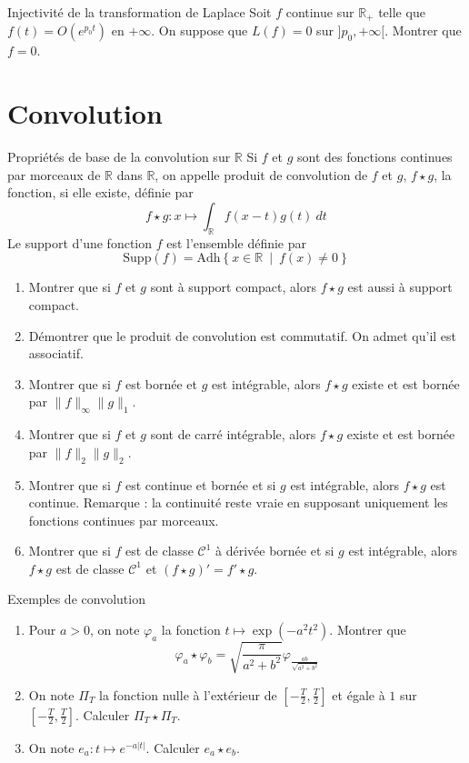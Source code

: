 \documentclass[french,a4paper]{article}
\newcommand{\R}{\mathbb{R}}
\theoremstyle{plain}
\theoremstyle{definition}
\theoremstyle{remark}
\begin{document}
\begin{ex}[Châteaux]{Injectivité de la transformation de Laplace}
	Soit $f$ continue sur $\R_+$ telle que $f(t)=O(e^{p_0t})$ en $+\infty$. On suppose que $L(f)=0$ sur $]p_0,+\infty[$. Montrer que $f=0$.
\end{ex}

\section{Convolution}

\begin{ex}[Châteaux]{Propriétés de base de la convolution sur $\R$}
	Si $f$ et $g$ sont des fonctions continues par morceaux de $\R$ dans $\R$, on appelle produit de convolution de $f$ et $g$, $f\star g$, la fonction, si elle existe, définie par $$f\star g:x\mapsto\displaystyle\int_\R f(x-t)g(t)\ dt$$Le support d'une fonction $f$ est l'ensemble définie par $$\text{Supp}(f)=\text{Adh}\left\{x\in\R\ \mid \ f(x)\ne 0\right\}$$
	\begin{enumerate}
		\item Montrer que si $f$ et $g$ sont à support compact, alors $f\star g$ est aussi à support compact.
		\item Démontrer que le produit de convolution est commutatif. On admet qu'il est associatif.
		\item Montrer que si $f$ est bornée et $g$ est intégrable, alors $f\star g$ existe et est bornée par $\lVert f\rVert_\infty\lVert g\rVert_1$.
		\item Montrer que si $f$ et $g$ sont de carré intégrable, alors $f\star g$ existe et est bornée par $\lVert f\rVert_2\lVert g\rVert_2$.
		\item Montrer que si $f$ est continue et bornée et si $g$ est intégrable, alors $f\star g$ est continue. Remarque : la continuité reste vraie en supposant uniquement les fonctions continues par morceaux.
		\item Montrer que si $f$ est de classe $\mathcal{C}^1$ à dérivée bornée et si $g$ est intégrable, alors $f\star g$ est de classe $\mathcal{C}^1$ et $(f\star g)'=f'\star g$.
	\end{enumerate}
\end{ex}

\begin{ex}[Châteaux]{Exemples de convolution}
	\begin{enumerate}
		\item Pour $a>0$, on note $\varphi_a$ la fonction $t\mapsto\exp(-a^2t^2)$. Montrer que $$\varphi_a\star\varphi_b=\sqrt{\frac{\pi}{a^2+b^2}}\varphi_{\frac{ab}{\sqrt{a^2+b^2}}}$$
		\item On note $\Pi_T$ la fonction nulle à l'extérieur de $\displaystyle\left[-\frac{T}{2},\frac{T}{2}\right]$ et égale à $1$ sur $\displaystyle\left[-\frac{T}{2},\frac{T}{2}\right]$. Calculer $\Pi_T\star\Pi_T$.
		\item On note $e_a:t\mapsto e^{-a\lvert t\rvert}$. Calculer $e_a\star e_b$.
	\end{enumerate}
\end{ex}
\end{document}
